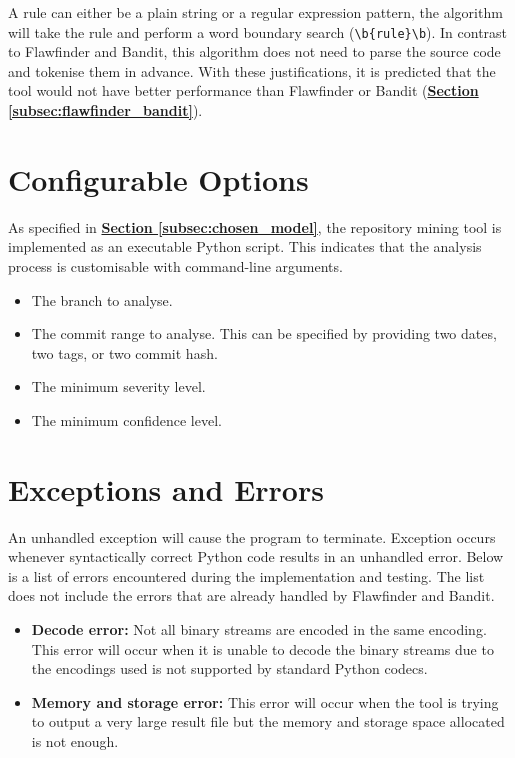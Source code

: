 \documentclass[12pt, a4paper]{report}
\begin{document}
A rule can either be a plain string or a regular expression pattern, the algorithm will take the
rule and perform a word boundary search (\verb|\b{rule}\b|). In contrast to Flawfinder and Bandit,
this algorithm does not need to parse the source code and tokenise them in advance. With these
justifications, it is predicted that the tool would not have better performance than Flawfinder or
Bandit (\hyperref[subsec:flawfinder_bandit]{\textbf{Section \ref*{subsec:flawfinder_bandit}}}).

\section{Configurable Options}
As specified in \hyperref[subsec:chosen_model]{\textbf{Section \ref*{subsec:chosen_model}}}, the
repository mining tool is implemented as an executable Python script. This indicates that the
analysis process is customisable with command-line arguments.

\begin{itemize}
  \item The branch to analyse.
  \item The commit range to analyse. This can be specified by providing two dates, two tags, or two
  commit hash.
  \item The minimum severity level.
  \item The minimum confidence level.
\end{itemize}

\section{Exceptions and Errors}
An unhandled exception will cause the program to terminate. Exception occurs whenever syntactically
correct Python code results in an unhandled error. Below is a list of errors encountered during the
implementation and testing. The list does not include the errors that are already handled by
Flawfinder and Bandit.
\begin{itemize}
  \item \textbf{Decode error:} Not all binary streams are encoded in the same encoding. This error
  will occur when it is unable to decode the binary streams due to the encodings used is not
  supported by standard Python codecs.
  \item \textbf{Memory and storage error:} This error will occur when the tool is trying to output a
  very large result file but the memory and storage space allocated is not enough.
\end{itemize}
\end{document}
